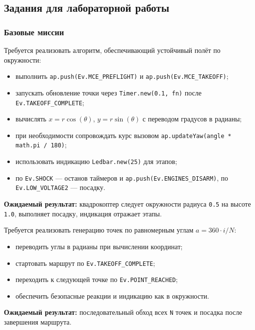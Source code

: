 \subsection{Задания для лабораторной работы}
\subsubsection{Базовые миссии}

\begin{taskbox}[Полёт по окружности радиуса \texttt{r=0.5} на высоте \texttt{z=1.0}]
Требуется реализовать алгоритм, обеспечивающий устойчивый полёт по окружности:
\begin{itemize}
    \item выполнить \texttt{ap.push(Ev.MCE\_PREFLIGHT)} и \texttt{ap.push(Ev.MCE\_TAKEOFF)};
    \item запускать обновление точки через \texttt{Timer.new(0.1, fn)} после \texttt{Ev.TAKEOFF\_COMPLETE};
    \item вычислять \(x = r \cos(\theta)\), \(y = r \sin(\theta)\) с переводом градусов в радианы;
    \item при необходимости сопровождать курс вызовом \texttt{ap.updateYaw(angle * math.pi / 180)};
    \item использовать индикацию \texttt{Ledbar.new(25)} для этапов;
    \item по \texttt{Ev.SHOCK} — останов таймеров и \texttt{ap.push(Ev.ENGINES\_DISARM)}, по \texttt{Ev.LOW\_VOLTAGE2} — посадку.
\end{itemize}

\textbf{Ожидаемый результат:} квадрокоптер следует окружности радиуса \texttt{0.5} на высоте \texttt{1.0}, выполняет посадку, индикация отражает этапы.
\end{taskbox}

\begin{taskbox}
Требуется реализовать генерацию точек по равномерным углам \(a = 360 \cdot i / N\):
\begin{itemize}
    \item переводить углы в радианы при вычислении координат;
    \item стартовать маршрут по \texttt{Ev.TAKEOFF\_COMPLETE};
    \item переходить к следующей точке по \texttt{Ev.POINT\_REACHED};
    \item обеспечить безопасные реакции и индикацию как в окружности.
\end{itemize}

\textbf{Ожидаемый результат:} последовательный обход всех \texttt{N} точек и посадка после завершения маршрута.
\end{taskbox}

